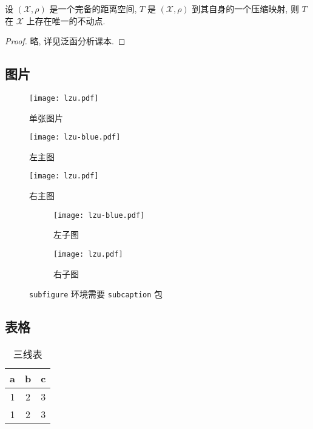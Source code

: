 \documentclass{lzuthesis}
\begin{document}
\begin{theorem}
	\label{thm1}
	设 $(\mathscr{X}, \rho)$ 是一个完备的距离空间, $T$ 是 $(\mathscr{X},
	\rho)$ 到其自身的一个压缩映射, 则 $T$ 在 $\mathscr{X}$
	上存在唯一的不动点.
\end{theorem}

\begin{proof}
	略, 详见泛函分析课本. 
\end{proof}

\subsection{图片}

\begin{figure}[!h]
	\centering
	\texttt{[image: lzu.pdf]}
	\caption{单张图片}
	\label{p1}
\end{figure}

\begin{figure}[!h]
	\centering
	\begin{minipage}[t]{0.2\linewidth}
		\centering
		\texttt{[image: lzu-blue.pdf]}
		\caption{左主图}
	\end{minipage}
	\quad
	\begin{minipage}[t]{0.2\linewidth} 
		\centering 
		\texttt{[image: lzu.pdf]} 
		\caption{右主图} 
	\end{minipage}
\end{figure}

\begin{figure}[!h]
	\centering
	\begin{subfigure}[b]{0.2\linewidth}
		\texttt{[image: lzu-blue.pdf]}
		\caption{左子图}
	\end{subfigure}
	\quad
	\begin{subfigure}[b]{0.2\linewidth}
		\texttt{[image: lzu.pdf]}
		\caption{右子图}
	\end{subfigure}
	\caption{\texttt{subfigure} 环境需要 \texttt{subcaption} 包}
\end{figure}

\subsection{表格}

\begin{table}[!h]
	\caption{三线表}
	\centering
	\begin{tabular}{ccc}
		\hline
		a &b &c \\
		\hline
		1 &2 &3 \\
		1 &2 &3 \\
		\hline
	\end{tabular}
\end{table}
\end{document}
